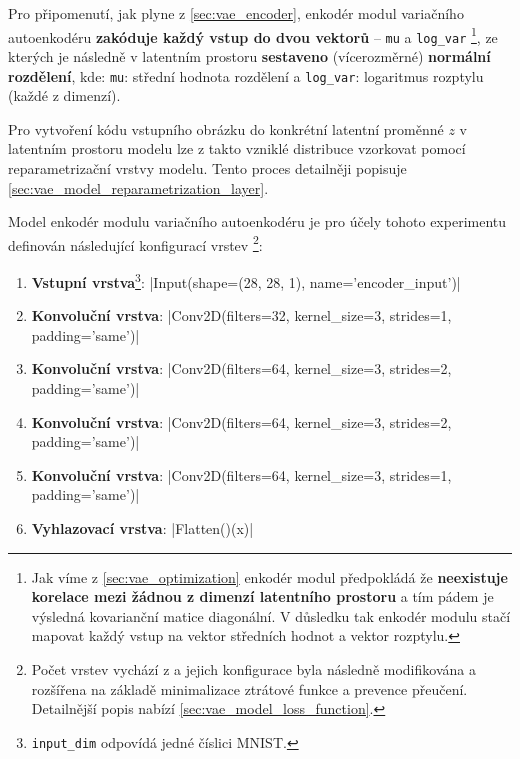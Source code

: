 Pro připomenutí, jak plyne z \autoref{sec:vae_encoder}, enkodér modul variačního autoenkodéru \textbf{zakóduje každý vstup do dvou vektorů} – \lstinline{mu} a \lstinline{log_var}
\footnote{Jak víme z \autoref{sec:vae_optimization} enkodér modul předpokládá že \textbf{neexistuje korelace mezi žádnou z dimenzí latentního prostoru} a tím pádem je výsledná kovarianční matice diagonální. V důsledku tak enkodér modulu stačí mapovat každý vstup na vektor středních hodnot a vektor rozptylu.},
ze kterých je následně v latentním prostoru \textbf{sestaveno} (vícerozměrné) \textbf{normální rozdělení}, kde:
\lstinline{mu}: střední hodnota rozdělení a \lstinline{log_var}: logaritmus rozptylu (každé z dimenzí).

Pro vytvoření kódu vstupního obrázku do konkrétní latentní proměnné $z$ v latentním prostoru modelu lze z takto vzniklé distribuce vzorkovat pomocí reparametrizační vrstvy modelu. Tento proces detailněji popisuje \autoref{sec:vae_model_reparametrization_layer}.

Model enkodér modulu variačního autoenkodéru je pro účely tohoto experimentu definován následující konfigurací vrstev \footnote{Počet vrstev vychází z \textcite{Kingma2014} a jejich konfigurace byla následně modifikována a rozšířena na základě minimalizace ztrátové funkce a prevence přeučení. Detailnější popis nabízí \autoref{sec:vae_model_loss_function}.}:
\begin{enumerate}
    \item \textbf{Vstupní vrstva}\footnote{\lstinline{input_dim} odpovídá jedné číslici MNIST.}: |Input(shape=(28, 28, 1), name='encoder_input')|
    \item \textbf{Konvoluční vrstva}: |Conv2D(filters=32, kernel_size=3, strides=1, padding='same')|
    \item \textbf{Konvoluční vrstva}: |Conv2D(filters=64, kernel_size=3, strides=2, padding='same')|
    \item \textbf{Konvoluční vrstva}: |Conv2D(filters=64, kernel_size=3, strides=2, padding='same')|
    \item \textbf{Konvoluční vrstva}: |Conv2D(filters=64, kernel_size=3, strides=1, padding='same')|
    \item \textbf{Vyhlazovací vrstva}: |Flatten()(x)|
\end{enumerate}

